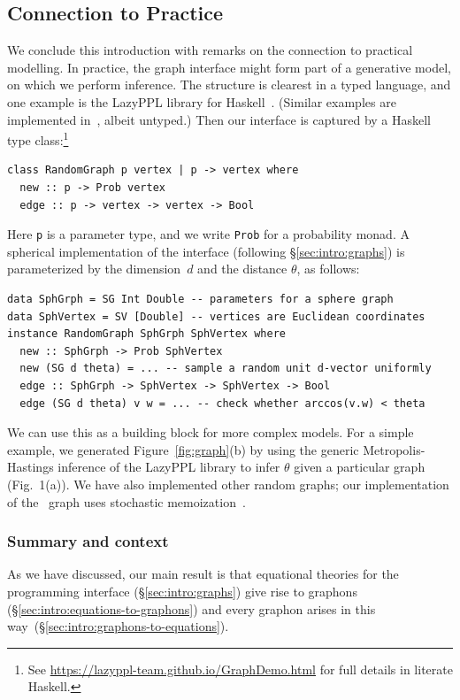 \subsection{Connection to Practice}\label{sec:intro:practice}
We conclude this introduction with remarks on the connection to practical modelling. 
In practice, the graph interface might form part of a generative model, on which we perform inference.
The structure is clearest in a typed language, and one example is the LazyPPL library for Haskell~\cite{lazyppl}.
(Similar examples are implemented in~\cite[Ch.~12]{probmods1},
 albeit untyped.)
Then our interface is captured by a Haskell type class:\footnote{See \url{https://lazyppl-team.github.io/GraphDemo.html} for full details in literate Haskell.}
\begin{lstlisting}
class RandomGraph p vertex | p -> vertex where
  new :: p -> Prob vertex
  edge :: p -> vertex -> vertex -> Bool
  \end{lstlisting}
Here \lstinline|p| is a parameter type, and we write \lstinline|Prob| for a probability monad. 
A spherical implementation of the interface (following \S\ref{sec:intro:graphs}) is parameterized by the dimension~$d$ and the distance $\theta$, as follows:
\begin{lstlisting}
data SphGrph = SG Int Double -- parameters for a sphere graph
data SphVertex = SV [Double] -- vertices are Euclidean coordinates
instance RandomGraph SphGrph SphVertex where
  new :: SphGrph -> Prob SphVertex
  new (SG d theta) = ... -- sample a random unit d-vector uniformly 
  edge :: SphGrph -> SphVertex -> SphVertex -> Bool
  edge (SG d theta) v w = ... -- check whether arccos(v.w) < theta
\end{lstlisting}
We can use this as a building block for more complex models.
For a simple example, we generated Figure~\ref{fig:graph}(b) by using the generic Metropolis-Hastings inference of the LazyPPL library to infer $\theta$ given a particular graph (Fig.~1(a)). We have also implemented other random graphs; our implementation of the \ErdosRenyi\ graph uses stochastic memoization~\cite{roy2008stochastic,kaddar-staton-stoch-mem}.


\subsubsection*{Summary and context}
As we have discussed, our main result is that equational theories for the programming interface (\S\ref{sec:intro:graphs})
give rise to graphons (\S\ref{sec:intro:equations-to-graphons}) and every graphon arises in this way~(\S\ref{sec:intro:graphons-to-equations}).

